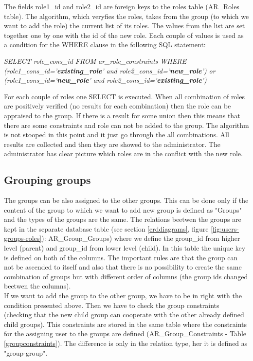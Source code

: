 The fields role1\_id and role2\_id are foreign keys to the roles table (AR\_Roles table). 
The algorithm, which veryfies the roles, takes from the group (to which we want to add the role) the current list of its roles. The values from the list are set together one by one with the id of the new role. Each couple of values is used as a condition for the WHERE clause in the following SQL statement:
\begin{center}\emph{SELECT role\_cons\_id FROM ar\_role\_constraints WHERE
(role1\_cons\_id='}\textbf{\emph{existing\_role}}\emph{' and role2\_cons\_id='}\textbf{\emph{new\_role}}\emph{') or (role1\_cons\_id='}\textbf{\emph{new\_role}}\emph{' and role2\_cons\_id='}\textbf{\emph{existing\_role}}\emph{')}\end{center}

For each couple of roles one SELECT is executed. When all combination of roles are positively verified (no results for each combination) then the role can be appraised to the group. If there is a result for some union then this means that there are some constraints and role can not be added to the group. The algorithm is not stooped in this point and it just go through the all combinations. All results are collected and then they are showed to the administrator. The administrator has clear picture which roles are in the conflict with the new role.

\subsection{Grouping groups \label{groupinggroups}} 
The groups can be also assigned to the other groups. This can be done only if the content of the group to which we want to add new group is defined as "Groups" and the types of the groups are the same. The relations beetwen the groups are kept in the separate database table (see section \ref{erddiagrams}, figure \ref{fig:users-groups-roles}): AR\_Group\_Groups) where we define the group\_id from higher level (parent) and group\_id from lower level (child). In this table the unique key is defined on both of the columns. The important rules are that the group can not be ascended to itself and also that there is no possibility to create the same combination of groups but with different order of columns (the group ids changed beetwen the columns).\\
If we want to add the group to the other group, we have to be in right with the condition presented above. Then we have to check the group constraints (checking that the new child group can cooperate with the other already defined child groups).  This constraints are stored in the same table where the constraints for the assigning user to the groups are defined (AR\_Group\_Constraints - Table \ref{groupconstraints}). The difference is only in the relation type, her it is defined as "group-group".

